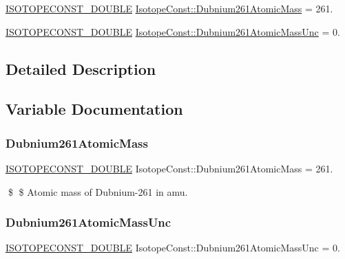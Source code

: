 \begin{DoxyCompactItemize}
\item 
\mbox{\hyperlink{group___isotope_const-_macros_ga8f45a7272ce02c0b4c65c44636ed719a}{I\+S\+O\+T\+O\+P\+E\+C\+O\+N\+S\+T\+\_\+\+D\+O\+U\+B\+LE}} \mbox{\hyperlink{group___isotope_const-_dubnium-_db261_gaaaec6373a8e0a0a9bd5615b8e2ea5df4}{Isotope\+Const\+::\+Dubnium261\+Atomic\+Mass}} = 261.
\item 
\mbox{\hyperlink{group___isotope_const-_macros_ga8f45a7272ce02c0b4c65c44636ed719a}{I\+S\+O\+T\+O\+P\+E\+C\+O\+N\+S\+T\+\_\+\+D\+O\+U\+B\+LE}} \mbox{\hyperlink{group___isotope_const-_dubnium-_db261_ga4114f16ba2b464e8c7bbbb4991adb839}{Isotope\+Const\+::\+Dubnium261\+Atomic\+Mass\+Unc}} = 0.
\end{DoxyCompactItemize}


\subsection{Detailed Description}


\subsection{Variable Documentation}
\mbox{\label{group___isotope_const-_dubnium-_db261_gaaaec6373a8e0a0a9bd5615b8e2ea5df4}} 
\subsubsection{\texorpdfstring{Dubnium261\+Atomic\+Mass}{Dubnium261AtomicMass}}
{\footnotesize\ttfamily \mbox{\hyperlink{group___isotope_const-_macros_ga8f45a7272ce02c0b4c65c44636ed719a}{I\+S\+O\+T\+O\+P\+E\+C\+O\+N\+S\+T\+\_\+\+D\+O\+U\+B\+LE}} Isotope\+Const\+::\+Dubnium261\+Atomic\+Mass = 261.}

\$ \$ Atomic mass of Dubnium-\/261 in amu. \mbox{\label{group___isotope_const-_dubnium-_db261_ga4114f16ba2b464e8c7bbbb4991adb839}} 
\subsubsection{\texorpdfstring{Dubnium261\+Atomic\+Mass\+Unc}{Dubnium261AtomicMassUnc}}
{\footnotesize\ttfamily \mbox{\hyperlink{group___isotope_const-_macros_ga8f45a7272ce02c0b4c65c44636ed719a}{I\+S\+O\+T\+O\+P\+E\+C\+O\+N\+S\+T\+\_\+\+D\+O\+U\+B\+LE}} Isotope\+Const\+::\+Dubnium261\+Atomic\+Mass\+Unc = 0.}

